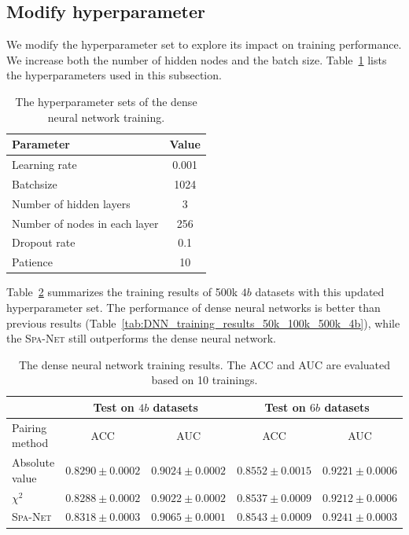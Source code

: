 \documentclass[12pt]{article}
\begin{document}
    \subsection{Modify hyperparameter}%
    \label{sub:modify_hyperparameter}
        We modify the hyperparameter set to explore its impact on training performance. We increase both the number of hidden nodes and the batch size. Table~\ref{tab:DNN_hyperparameters_2} lists the hyperparameters used in this subsection.
        \begin{table}[htpb]
            \centering
            \caption{The hyperparameter sets of the dense neural network training.}
            \label{tab:DNN_hyperparameters_2}
            \begin{tabular}{l|c}
            Parameter                     & Value \\ \hline
            Learning rate                 & 0.001 \\
            Batchsize                     & 1024  \\
            Number of hidden layers       & 3     \\
            Number of nodes in each layer & 256   \\
            Dropout rate                  & 0.1   \\
            Patience                      & 10   
            \end{tabular}
        \end{table}

        Table~\ref{tab:DNN_training_results_500k_4b_256_nodes} summarizes the training results of 500k $4b$ datasets with this updated hyperparameter set. The performance of dense neural networks is better than previous results (Table~\ref{tab:DNN_training_results_50k_100k_500k_4b}), while the \textsc{Spa-Net} still outperforms the dense neural network.
        \begin{table}[htpb]
            \centering
            \caption{The dense neural network training results. The ACC and AUC are evaluated based on 10 trainings.}
            \label{tab:DNN_training_results_500k_4b_256_nodes}
            \begin{tabular}{l|cc|cc}
                             & \multicolumn{2}{c|}{Test on $4b$ datasets}& \multicolumn{2}{c}{Test on $6b$ datasets} \\ \hline
            Pairing method   & ACC                 & AUC                 & ACC                 & AUC                 \\ \hline
            Absolute value   & $0.8290 \pm 0.0002$ & $0.9024 \pm 0.0002$ & $0.8552 \pm 0.0015$ & $0.9221 \pm 0.0006$ \\
            $\chi^2$         & $0.8288 \pm 0.0002$ & $0.9022 \pm 0.0002$ & $0.8537 \pm 0.0009$ & $0.9212 \pm 0.0006$ \\
            \textsc{Spa-Net} & $0.8318 \pm 0.0003$ & $0.9065 \pm 0.0001$ & $0.8543 \pm 0.0009$ & $0.9241 \pm 0.0003$  
            \end{tabular}
        \end{table}


		
\end{document}
